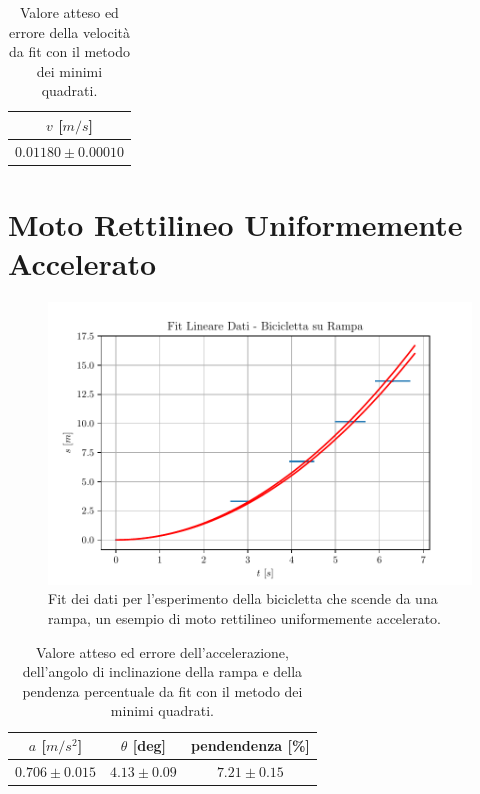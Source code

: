 \documentclass{report} \usepackage[T1]{fontenc} \usepackage[italian]{babel}
\begin{document}
\begin{table}[H]
  \renewcommand{\arraystretch}{1.5}
  \centering
  \begin{tabular}{ | c | }
    \hline
    $v$ [$m/s$] \\
    \hline
    $0.01180\pm0.00010$ \\
    \hline
  \end{tabular}
  \caption{Valore atteso ed errore della velocità da fit con il metodo dei minimi
           quadrati.}
  \label{tab:fit_marble}
\end{table}

\section{Moto Rettilineo Uniformemente Accelerato}

\begin{figure}[H]
  \centering
  \includegraphics[width=\textwidth]{fit_bike}
  \caption{Fit dei dati per l'esperimento della bicicletta che scende da una rampa,
           un esempio di moto rettilineo uniformemente accelerato.}
  \label{fig:fit_bike}
\end{figure}

\begin{table}[H]
  \renewcommand{\arraystretch}{1.5}
  \centering
  \begin{tabular}{ | c | c | c | }
    \hline
    $a$ [$m/s^2$] &  $\theta$ [deg] & pendendenza [\%] \\
    \hline
    $0.706\pm0.015$ & $4.13\pm0.09$ & $7.21\pm0.15$ \\
    \hline
  \end{tabular}
  \caption{Valore atteso ed errore dell'accelerazione, dell'angolo di inclinazione della rampa
           e della pendenza percentuale da fit con il metodo dei minimi quadrati.}
  \label{tab:fit_bike}
\end{table}
\end{document}
